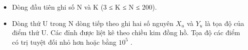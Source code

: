 \begin{itemize}
	\item     Dòng đầu tiên ghi số N và K (3 ≤ K ≤ N ≤ 200).   
	\item     Dòng thứ U trong N dòng tiếp theo ghi hai số nguyên $X_{u}$    và $Y_{u}$    là tọa độ của điểm thứ U. Các đỉnh được liệt kê theo chiều kim đồng hồ. Tọa độ các điểm có trị tuyệt đối nhỏ hơn hoặc bằng $10^{5}$    .   
\end{itemize}